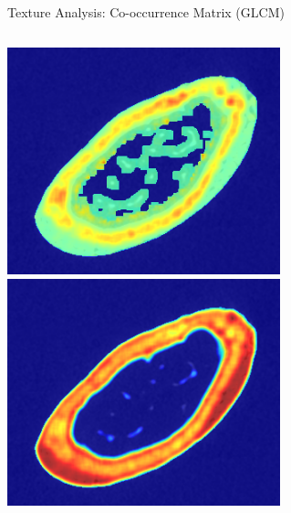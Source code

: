 \documentclass[10pt,aspectratio=169]{beamer}
\begin{document}
\begin{frame}{Texture Analysis: Co-occurrence Matrix (GLCM)}
\begin{columns}[onlytextwidth]
\begin{columns}
    \centering
    \includegraphics[width=0.9\textwidth]{./TextureMapsImages/GLRLM_49_LEFT_1_crop.png}\\
    \includegraphics[width=0.9\textwidth]{./TextureMapsImages/GLRLM_49_LEFT_3_crop.png}
    \end{columns}
  \end{columns}
\end{frame}
\end{document}
